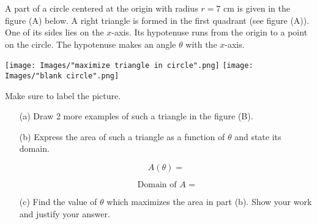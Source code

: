 \documentclass[handout,nooutcomes]{ximera}
\begin{document}
\begin{problem}
  A part of a circle centered at the origin with radius $r = 7 \text{ cm}$ is given in the figure (A) below.
  A right triangle is formed in the first quadrant (see figure (A)).
  One of its sides lies on the $x$-axis.
  Its hypotenuse runs from the origin to a point on the circle.
  The hypotenuse makes an angle $\theta$ with the $x$-axis.

  \begin{image}
    \texttt{[image: Images/"maximize triangle in circle".png]}
    \texttt{[image: Images/"blank circle".png]}
  \end{image}
  Make sure to label the picture.

  \begin{itemize}
    \item[(a)]
      Draw 2 more examples of such a triangle in the figure (B).

    \item[(b)]
      Express the area of such a triangle as a function of $\theta$ and state its domain.

      \[
        A(\theta) = 
      \]

      \[
       \mbox{Domain of $A$ =}
      \]

    \item[(c)]
      Find the value of $\theta$ which maximizes the area in part (b).
      Show your work and justify your answer.
  \end{itemize}
\end{problem}
\end{document}
